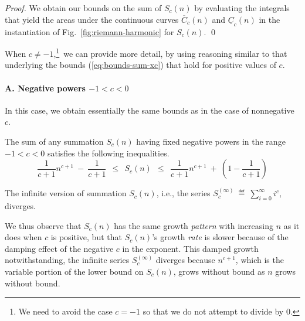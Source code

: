 \begin{proof}
We obtain our bounds on the sum of $S_c(n)$ by evaluating the integrals that yield the areas
under the continuous curves $\overline{C}_c(n)$ and $ \underline{C}_c(n)$ in the instantiation of Fig.~\ref{fig:riemann-harmonic} for $S_c(n)$.  \qed
\end{proof}

When $c \neq -1$,\footnote{We need to avoid the case $c = -1$ so that we do not attempt to divide by $0$.}~we can provide more detail, by using reasoning similar to that underlying the bounds (\ref{eq:bounds-sum-xc}) that hold for positive values of $c$.

\paragraph{A. Negative powers $-1 < c < 0$}

In this case, we obtain essentially the same bounds as in the case of nonnegative $c$.
%
%
%

\begin{prop}
\label{thm:bounds-(-1)<c<0}
The sum of any summation $S_c(n)$ having fixed negative powers in the range $-1 < c <0$
satisfies the following inequalities.
\begin{equation}
\label{eq:bounds-(-1)<c<0}
 \frac{1}{c+1} n^{c+1} \ - \  \frac{1}{c+1}
  \ \ \leq \ \ S_c(n)
  \ \ \leq \ \
\frac{1}{c+1} n^{c+1} \ + \ \left(1 - \frac{1}{c+1} \right)
\end{equation}

\noindent
The infinite version of summation $S_c(n)$, i.e., the series
$\displaystyle S_c^{(\infty)} \ \eqdef \ \sum_{i=0}^\infty i^c$,
diverges.
\end{prop}


We thus observe that $S_c(n)$ has the same growth {\em pattern} with increasing $n$ as it does when $c$ is positive, but that $S_c(n)$'s growth {\em rate} is slower because of the damping effect of the negative $c$ in the exponent.  This damped growth notwithstanding, the infinite series $S_c^{(\infty)}$ diverges because $n^{c+1}$, which is the variable portion of the lower bound on $S_c(n)$, grows without bound as $n$ grows without bound.

